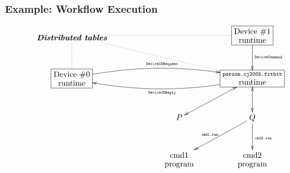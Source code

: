 \documentclass{beamer}
\begin{document}
\begin{frame}[fragile]
\frametitle{Example: Workflow Execution}

{\scriptsize
\[\xymatrix@+0.5pc{
  & \txt{\bf\em Distributed tables} \ar@{.}[rrr]\ar@{.}[d]\ar@{.}[rrrd]
  &&&*+[F]\txt{Device\ \#1\\ runtime} \ar[d]^{\txt{\tiny{}\tt{}DeviceCommand}}&\\ 
 & *+[F]\txt{Device\ \#0\\ runtime}
  \ar@/^3ex/[rrr]^{\txt{\tiny{}\tt{}DeviceIDRequest}}
  \ar@/_3ex/@{<-}[rrr]_{\txt{\tiny{}\tt{}DeviceIDReply}}
   && &
  *+[F]\txt{{\scriptsize\tt{}person.cj2005.fitbit}\\ runtime} \ar@{<->}[d]
  \ar@{<->}[dl]&\\ 
&&  &P &Q \ar[dl]_{\txt{\tiny{}\tt{}cmd1.run}}\ar[d]^{\txt{\tiny{}\tt{}cmd2.run}}\\
&&  &\txt{cmd1 \\ program} &\txt{cmd2\\ program} \\
}\]
}

\end{frame}


%
%






\end{document}

